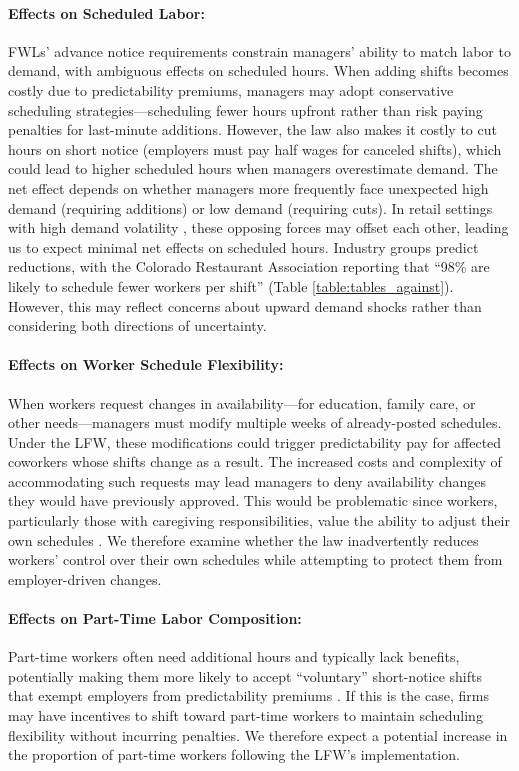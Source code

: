 \documentclass[letterpaper,11pt,leqno]{article}
\theoremstyle{paper}
\begin{document}
\paragraph{Effects on Scheduled Labor:}
FWLs' advance notice requirements constrain managers' ability to match labor to demand, with ambiguous effects on scheduled hours. When adding shifts becomes costly due to predictability premiums, managers may adopt conservative scheduling strategies—scheduling fewer hours upfront rather than risk paying penalties for last-minute additions. However, the law also makes it costly to cut hours on short notice (employers must pay half wages for canceled shifts), which could lead to higher scheduled hours when managers overestimate demand. The net effect depends on whether managers more frequently face unexpected high demand (requiring additions) or low demand (requiring cuts). In retail settings with high demand volatility \citep{netessine_traffic,kesavan_traffic,fisher_2021,retailAIScheduling2025}, these opposing forces may offset each other, leading us to expect minimal net effects on scheduled hours. Industry groups predict reductions, with the Colorado Restaurant Association reporting that ``98\% are likely to schedule fewer workers per shift'' (Table \ref{table:tables_against}). However, this may reflect concerns about upward demand shocks rather than considering both directions of uncertainty.


\paragraph{Effects on Worker Schedule Flexibility:}
When workers request changes in availability—for education, family care, or other needs—managers must modify multiple weeks of already-posted schedules. Under the LFW, these modifications could trigger predictability pay for affected coworkers whose shifts change as a result. The increased costs and complexity of accommodating such requests may lead managers to deny availability changes they would have previously approved. This would be problematic since workers, particularly those with caregiving responsibilities, value the ability to adjust their own schedules \citep{kelly2011changing,harknett2022who,mas2017valuing}. We therefore examine whether the law inadvertently reduces workers' control over their own schedules while attempting to protect them from employer-driven changes.

\paragraph{Effects on Part-Time Labor Composition:}
Part-time workers often need additional hours and typically lack benefits, potentially making them more likely to accept ``voluntary'' short-notice shifts that exempt employers from predictability premiums \citep{kalleberg2009precarious,lambert_2008}. If this is the case, firms may have incentives to shift toward part-time workers to maintain scheduling flexibility without incurring penalties. We therefore expect a potential increase in the proportion of part-time workers following the LFW's implementation. 
\end{document}
